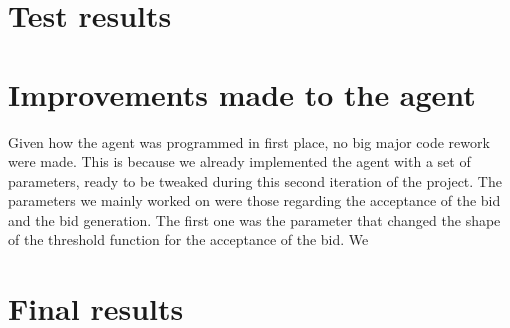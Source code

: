 \documentclass[a4,11pt]{scrartcl}
\begin{document}
\section{Test results}
\label{sec:testresults}

\section{Improvements made to the agent}
Given how the agent was programmed in first place, no big major code rework were made. This is because we already implemented the agent with a set of parameters, ready to be tweaked during this second iteration of the project. 
The parameters we mainly worked on were those regarding the acceptance of the bid and the bid generation. 
The first one was the parameter that changed the shape of the threshold function for the acceptance of the bid. We 
\label{sec:improvements}

\section{Final results}
\label{sec:finalresults}
\end{document}
